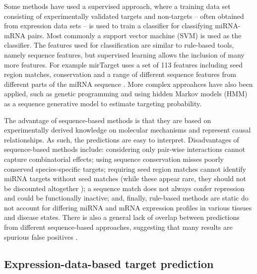 Some methods have used a supervised approach, where a training data set
consisting of experimentally validated targets and non-targets -- often
obtained from expression data sets -- is used to train a classifier for
classifying miRNA-mRNA pairs. Most commonly a support vector machine (SVM) is
used as the classifier. The features used for classification are similar to
rule-based tools, namely sequence features, but supervised learning allows the
inclusion of many more features. For example mirTarget uses a set of 113
features including seed region matches, conservation and a range of different
sequence features from different parts of the miRNA sequence
\citep{mirTarget}. More complex approahces have also been applied,
such as genetic programming and using hidden Markov models (HMM) as a 
sequence generative model to estimate targeting probability.


The advantage of sequence-based methods is that they are based on
experimentally derived knowledge on molecular mechanisms and represent causal
relationships. As such, the predictions are easy to interpret. Disadvantages
of sequence-based methods include: considering only pair-wise
interactions cannot capture combinatorial
effects; using sequence conservation misses poorly conserved species-specific
targets; requiring seed region matches cannot identify miRNA targets without
seed matches (while these appear rare, they should not be discounted
altogether \citep{Bartel2009}); a sequence match does not always confer %
repression and could be functionally inactive; and, finally, rule-based
methods are static do not account for differing miRNA and mRNA expression
profiles in various tissues and disease states. There is also a general lack
of overlap between predictions from different sequence-based approaches,
suggesting that many results are spurious false positives \citep{Muniategui2013}.






\subsection{Expression-data-based target prediction}\label{expr-methods}

